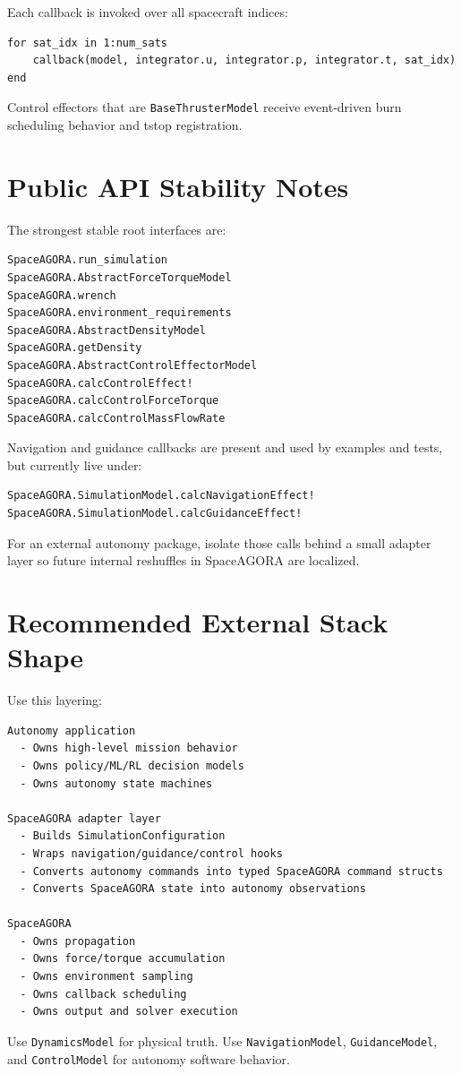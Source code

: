 \documentclass[11pt]{article}
\begin{document}
Each callback is invoked over all spacecraft indices:

\begin{lstlisting}
for sat_idx in 1:num_sats
    callback(model, integrator.u, integrator.p, integrator.t, sat_idx)
end
\end{lstlisting}

Control effectors that are \texttt{BaseThrusterModel} receive event-driven burn
scheduling behavior and tstop registration.

\section{Public API Stability Notes}

The strongest stable root interfaces are:

\begin{lstlisting}
SpaceAGORA.run_simulation
SpaceAGORA.AbstractForceTorqueModel
SpaceAGORA.wrench
SpaceAGORA.environment_requirements
SpaceAGORA.AbstractDensityModel
SpaceAGORA.getDensity
SpaceAGORA.AbstractControlEffectorModel
SpaceAGORA.calcControlEffect!
SpaceAGORA.calcControlForceTorque
SpaceAGORA.calcControlMassFlowRate
\end{lstlisting}

Navigation and guidance callbacks are present and used by examples and tests,
but currently live under:

\begin{lstlisting}
SpaceAGORA.SimulationModel.calcNavigationEffect!
SpaceAGORA.SimulationModel.calcGuidanceEffect!
\end{lstlisting}

For an external autonomy package, isolate those calls behind a small adapter
layer so future internal reshuffles in SpaceAGORA are localized.

\section{Recommended External Stack Shape}

Use this layering:

\begin{lstlisting}
Autonomy application
  - Owns high-level mission behavior
  - Owns policy/ML/RL decision models
  - Owns autonomy state machines

SpaceAGORA adapter layer
  - Builds SimulationConfiguration
  - Wraps navigation/guidance/control hooks
  - Converts autonomy commands into typed SpaceAGORA command structs
  - Converts SpaceAGORA state into autonomy observations

SpaceAGORA
  - Owns propagation
  - Owns force/torque accumulation
  - Owns environment sampling
  - Owns callback scheduling
  - Owns output and solver execution
\end{lstlisting}

Use \texttt{DynamicsModel} for physical truth. Use
\texttt{NavigationModel}, \texttt{GuidanceModel}, and \texttt{ControlModel}
for autonomy software behavior.
\end{document}
